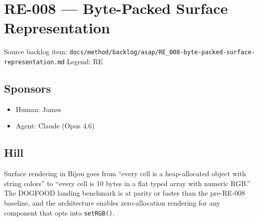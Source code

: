 \chapter{RE-008 --- Byte-Packed Surface Representation}\label{record-250}

\smallskip

Source backlog item: \texttt{d\allowbreak{}o\allowbreak{}c\allowbreak{}s\allowbreak{}/\allowbreak{}m\allowbreak{}e\allowbreak{}t\allowbreak{}h\allowbreak{}o\allowbreak{}d\allowbreak{}/\allowbreak{}b\allowbreak{}a\allowbreak{}c\allowbreak{}k\allowbreak{}l\allowbreak{}o\allowbreak{}g\allowbreak{}/\allowbreak{}a\allowbreak{}s\allowbreak{}a\allowbreak{}p\allowbreak{}/\allowbreak{}R\allowbreak{}E\allowbreak{}\_\allowbreak{}0\allowbreak{}0\allowbreak{}8\allowbreak{}-\allowbreak{}b\allowbreak{}y\allowbreak{}t\allowbreak{}e\allowbreak{}-\allowbreak{}p\allowbreak{}a\allowbreak{}c\allowbreak{}k\allowbreak{}e\allowbreak{}d\allowbreak{}-\allowbreak{}s\allowbreak{}u\allowbreak{}r\allowbreak{}f\allowbreak{}a\allowbreak{}c\allowbreak{}e\allowbreak{}-\allowbreak{}r\allowbreak{}e\allowbreak{}p\allowbreak{}r\allowbreak{}e\allowbreak{}s\allowbreak{}e\allowbreak{}n\allowbreak{}t\allowbreak{}a\allowbreak{}t\allowbreak{}i\allowbreak{}o\allowbreak{}n\allowbreak{}.\allowbreak{}m\allowbreak{}d} Legend: RE

\section{Sponsors}\label{record-250-sponsors}

\begin{itemize}
\tightlist
\item
  Human: James
\item
  Agent: Claude (Opus 4.6)
\end{itemize}

\section{Hill}\label{record-250-hill}

Surface rendering in Bijou goes from ``every cell is a heap-allocated object with string colors'' to ``every cell is 10 bytes in a flat typed array with numeric RGB.'' The DOGFOOD landing benchmark is at parity or faster than the pre-RE-008 baseline, and the architecture enables zero-allocation rendering for any component that opts into \texttt{s\allowbreak{}e\allowbreak{}t\allowbreak{}R\allowbreak{}G\allowbreak{}B\allowbreak{}(\allowbreak{})}.

